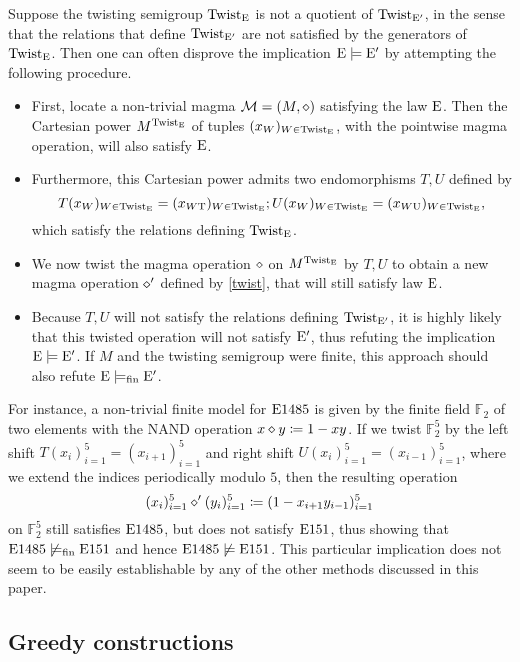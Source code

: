Suppose the twisting semigroup $\operatorname{Twist}_{\mathrm{E}}$ is not a quotient of $\operatorname{Twist}_{{\mathrm{E}'}}$, in the sense that the relations that define $\operatorname{Twist}_{{\mathrm{E}'}}$ are not satisfied by the generators of $\operatorname{Twist}_{\mathrm{E}}$.  Then one can often disprove the implication $\mathrm{E} \models {\mathrm{E}'}$ by attempting the following procedure.
\begin{itemize}
\item First, locate a non-trivial magma ${\mathcal{M}} = (M,\diamond)$ satisfying the law $\mathrm{E}$.  Then the Cartesian power $M^{\operatorname{Twist}_{\mathrm{E}}}$ of tuples $(x_W)_{W \in \operatorname{Twist}_{\mathrm{E}}}$, with the pointwise magma operation, will also satisfy $\mathrm{E}$.
\item Furthermore, this Cartesian power admits two endomorphisms $T, U$ defined by
$$ T (x_W)_{W \in \operatorname{Twist}_{\mathrm{E}}} = (x_{W \mathrm{T}})_{W \in \operatorname{Twist}_{\mathrm{E}}};
U (x_W)_{W \in \operatorname{Twist}_{\mathrm{E}}} = (x_{W \mathrm{U}})_{W \in \operatorname{Twist}_{\mathrm{E}}},$$
which satisfy the relations defining $\operatorname{Twist}_{\mathrm{E}}$.
\item We now twist the magma operation $\diamond$ on $M^{\operatorname{Twist}_{\mathrm{E}}}$ by $T,U$ to obtain a new magma operation $\diamond'$ defined by \eqref{twist}, that will still satisfy law $\mathrm{E}$.
\item Because $T, U$ will not satisfy the relations defining $\operatorname{Twist}_{{\mathrm{E}'}}$, it is highly likely that this twisted operation will not satisfy ${\mathrm{E}'}$, thus refuting the implication $\mathrm{E} \models {\mathrm{E}'}$.  If $M$ and the twisting semigroup were finite, this approach should also refute $\mathrm{E} \models_{\mathrm{fin}} {\mathrm{E}'}$.
\end{itemize}

For instance, a non-trivial finite model for $\mathrm{E}1485$ is given by the finite field $\mathbb{F}_2$ of two elements with the NAND operation $x \diamond y \coloneqq 1-xy$.  If we twist $\mathbb{F}_2^5$ by the left shift $T(x_i)_{i=1}^5 = (x_{i+1})_{i=1}^5$ and right shift $U(x_i)_{i=1}^5 = (x_{i-1})_{i=1}^5$, where we extend the indices periodically modulo $5$, then the resulting operation
$$ (x_i)_{i=1}^5 \diamond' (y_i)_{i=1}^5 \coloneqq (1 - x_{i+1} y_{i-1})_{i=1}^5$$
on $\mathbb{F}_2^5$ still satisfies $\mathrm{E}1485$, but does not satisfy $\mathrm{E}151$, thus showing that $\mathrm{E}1485 \not\models_{\mathrm{fin}} \mathrm{E}151$ and hence $\mathrm{E}1485 \not\models \mathrm{E}151$.  This particular implication does not seem to be easily establishable by any of the other methods discussed in this paper.

\subsection{Greedy constructions}\label{greedy-sec}

